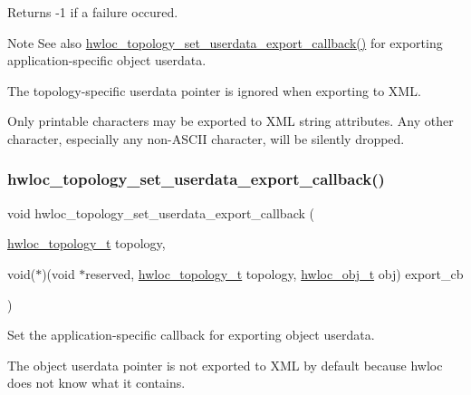 \begin{DoxyReturn}{Returns}
-\/1 if a failure occured.
\end{DoxyReturn}
\begin{DoxyNote}{Note}
See also \hyperlink{a00206_ga9d6ff0f7a8dd45be9aa8575ef31978cc}{hwloc\+\_\+topology\+\_\+set\+\_\+userdata\+\_\+export\+\_\+callback()} for exporting application-\/specific object userdata.

The topology-\/specific userdata pointer is ignored when exporting to X\+ML.

Only printable characters may be exported to X\+ML string attributes. Any other character, especially any non-\/\+A\+S\+C\+II character, will be silently dropped. 
\end{DoxyNote}
\mbox{\label{a00206_ga9d6ff0f7a8dd45be9aa8575ef31978cc}} 
\subsubsection{\texorpdfstring{hwloc\+\_\+topology\+\_\+set\+\_\+userdata\+\_\+export\+\_\+callback()}{hwloc\_topology\_set\_userdata\_export\_callback()}}
{\footnotesize\ttfamily void hwloc\+\_\+topology\+\_\+set\+\_\+userdata\+\_\+export\+\_\+callback (\begin{DoxyParamCaption}\item[{\hyperlink{a00186_ga9d1e76ee15a7dee158b786c30b6a6e38}{hwloc\+\_\+topology\+\_\+t}}]{topology,  }\item[{void($\ast$)(void $\ast$reserved, \hyperlink{a00186_ga9d1e76ee15a7dee158b786c30b6a6e38}{hwloc\+\_\+topology\+\_\+t} topology, \hyperlink{a00185_ga79b8ab56877ef99ac59b833203391c7d}{hwloc\+\_\+obj\+\_\+t} obj)}]{export\+\_\+cb }\end{DoxyParamCaption})}



Set the application-\/specific callback for exporting object userdata. 

The object userdata pointer is not exported to X\+ML by default because hwloc does not know what it contains.


